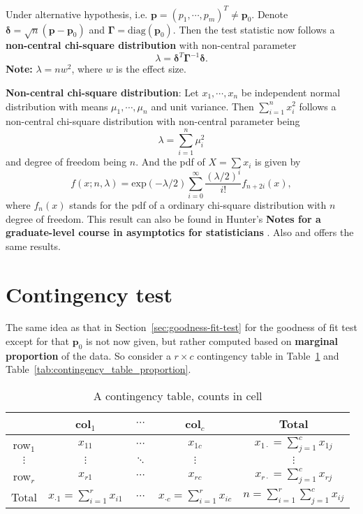 \documentclass[a4paper,12pt]{article}
\begin{document}
Under alternative hypothesis, i.e. $\bm{p}=\left(p_1, \cdots, p_m\right)^T\neq\bm{p}_0$. Denote $\bm{\delta} = \sqrt{n}\left(\bm{p} - \bm{p}_0\right)$ and $\bm{\Gamma} = \mathrm{diag}\left(\bm{p}_0\right)$. Then the test statistic now follows a \textbf{non-central chi-square distribution} with non-central parameter
\[
  \lambda = \bm{\delta}^T\bm{\Gamma}^{-1}\bm{\delta}
  .
\]
\textbf{Note:} $\lambda = nw^2$, where $w$ is the effect size.
\par
\textbf{Non-central chi-square distribution}: Let $x_1, \cdots, x_n$ be independent normal distribution with means $\mu_1, \cdots, \mu_n$ and unit variance. Then $\sum\limits_{i = 1}^nx_i^2$ follows a non-central chi-square distribution with non-central parameter being
\[
  \lambda = \sum\limits_{i = 1}^n\mu_i^2
\]
and degree of freedom being $n$. And the pdf of $X = \sum x_i$ is given by
\[
  f\left(x;n,\lambda\right)
  = \mathrm{exp}\left(-\lambda / 2\right)
  \sum\limits_{i = 0}^\infty\frac{\left(\lambda / 2\right)^i}{i!}
  f_{n + 2i}\left(x\right)
  ,
\]
where $f_{n}\left(x\right)$ stands for the pdf of a ordinary chi-square distribution with $n$ degree of freedom. This result can also be found in Hunter's \textbf{Notes for a graduate-level course in asymptotics for statisticians} \citep{Hunter2014p-}. Also \citet{Guenther1977p83-83} and \citet{Meng1966p965-975} offers the same results.

\section{Contingency test}
\label{sec:contingency-test}

The same idea as that in Section~\ref{sec:goodness-fit-test} for the goodness of fit test except for that $\bm{p}_0$ is not now given, but rather computed based on \textbf{marginal proportion} of the data. So consider a $r\times c$ contingency table in Table~\ref{tab:contingency_table_count} and Table~\ref{tab:contingency_table_proportion}.
\begin{table}[htbp]
  \centering
  \begin{tabular}{|c|c|c|c|c|}
    \hline
    & col$_1$ & $\cdots $ & col$_c$ & Total \\
    \hline
    row$_1$ & $x_{11}$ & $\cdots$ & $x_{1c}$ & $x_{1\cdot} = \sum\limits_{j = 1}^cx_{1j}$    \\
    \hline
    $\vdots$ & $\vdots$ & $\ddots$ & $\vdots$ & $\vdots$    \\
    \hline
    row$_r$ & $x_{r1}$ & $\cdots$ & $x_{rc}$ & $x_{r\cdot} = \sum\limits_{j = 1}^cx_{rj}$    \\
    \hline
    Total & $x_{\cdot 1} = \sum\limits_{i = 1}^rx_{i1}$
              & $\cdots$
                          & $x_{\cdot c} = \sum\limits_{i = 1}^rx_{ic}$
                                    & $n = \sum\limits_{i = 1}^r\sum\limits_{j = 1}^cx_{ij}$    \\
    \hline
  \end{tabular}
  \caption{A contingency table, counts in cell}
  \label{tab:contingency_table_count}
\end{table}
\end{document}
